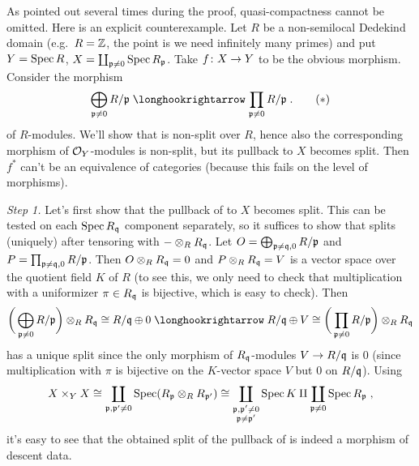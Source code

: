 \documentclass[a4paper,parskip=half,numbers=enddot, DIV=12]{scrreprt}
\begin{document}
\begin{rem}
	As pointed out several times during the proof, quasi-compactness cannot be omitted. Here is an explicit counterexample. Let $R$ be a non-semilocal Dedekind domain (e.g.\ $R=\mathbb{Z}$, the point is we need infinitely many primes) and put $Y=\operatorname{Spec} R$, $X=\coprod_{\mathfrak{p}\neq 0}\operatorname{Spec} R_{\mathfrak{p}}$. Take $f\colon X\morphism Y$ to be the obvious morphism. Consider the morphism
	\begin{align}\lbl{eq:nonSplitButSplit}
		\bigoplus_{\pp\neq 0}R/\pp\monomorphism\prod_{\pp\neq 0}R/\pp\;.\tag{$*$}
	\end{align}
	of $R$-modules. We'll show that  is non-split over $R$, hence also the corresponding morphism of $\mathcal{O}_Y$-modules is non-split, but its pullback to $X$ becomes split. Then $f^*$ can't be an equivalence of categories (because this fails on the level of morphisms).
	
	\emph{Step 1.} Let's first show that the pullback of  to $X$ becomes split. This can be tested on each $\operatorname{Spec} R_{\mathfrak{q}}$ component separately, so it suffices to show that  splits (uniquely) after tensoring with $-\otimes_RR_{\mathfrak{q}}$. Let $O=\bigoplus_{\mathfrak{p}\neq \mathfrak{q},0}R/\mathfrak{p}$ and $P=\prod_{\mathfrak{p}\neq \mathfrak{q},0}R/\mathfrak{p}$. Then $O\otimes_RR_{\mathfrak{q}}=0$ and $P\otimes_RR_{\mathfrak{q}}=V$ is a vector space over the quotient field $K$ of $R$ (to see this, we only need to check that multiplication with a uniformizer $\pi\in R_{\mathfrak{q}}$ is bijective, which is easy to check). Then
	\begin{align*}
		\bigg(\bigoplus_{\pp\neq 0}R/\pp\bigg)\otimes_RR_\qq\cong R/\qq\oplus 0\monomorphism R/\qq\oplus V\cong \bigg(\prod_{\pp\neq 0}R/\pp\bigg)\otimes_RR_\qq
	\end{align*}
	has a unique split since the only morphism of $R_{\mathfrak{q}}$-modules $V\morphism R/\qq$ is $0$ (since multiplication with $\pi$ is bijective on the $K$-vector space $V$ but $0$ on $R/\mathfrak{q}$). Using
	\begin{align*}
		X\times_YX\cong \coprod_{\mathfrak{p},\mathfrak{p}'\neq 0}\operatorname{Spec}(R_{\mathfrak{p}}\otimes_RR_{\mathfrak{p}'})\cong \coprod_{\substack{\mathfrak{p},\mathfrak{p}'\neq 0\\\mathfrak{p}\neq \mathfrak{p}'}}\operatorname{Spec} K\amalg \coprod_{\mathfrak{p}\neq 0}\operatorname{Spec} R_{\mathfrak{p}}\;,
	\end{align*}
	it's easy to see that the obtained split of the pullback of  is indeed a morphism of descent data.
	

\end{rem}
\end{document}
